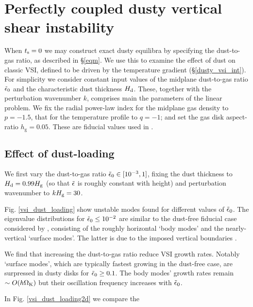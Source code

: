 \section{Perfectly coupled
  dusty vertical shear instability}\label{results} 

When $\tstop=0$ we may construct exact dusty equilibra by specifying
the dust-to-gas ratio, as described in \S\ref{eqm}. We use this to
examine the effect of dust on classic VSI, defined to be driven by the
temperature gradient (\S\ref{dusty_vsi_int}). For simplicity we
consider constant input values of the midplane dust-to-gas ratio
$\tepsilon_0$ and the characteristic dust thickness $\Hd$. These,
together with the perturbation wavenumber $k$, comprises main the
parameters of the linear problem. We fix the radial power-law index
for the midplane gas density to $p = -1.5$, that for the
temperature profile to $q=-1$; and set the gas disk aspect-ratio
$h_\mathrm{g}=0.05$. These are fiducial values used in . 

\subsection{Effect of dust-loading}
We first vary the dust-to-gas ratio $\tepsilon_0\in[10^{-3},1]$,
fixing the dust thickness to $\Hd=0.99\Hg$ (so that $\tepsilon$ is
roughly constant with height) and perturbation
wavenumber to $k\Hg = 30$. 

Fig. \ref{vsi_dust_loading} show unstable
modes found for different values of $\tepsilon_0$. The eigenvalue
distributions for $\tepsilon_0 \leq 10^{-2}$ are similar to the
dust-free fiducial case considered by , consisting
of the roughly horizontal `body modes' and the nearly-vertical
`surface modes'. The latter is due to the imposed vertical boundaries
\citep{barker15}.  

We find that increasing the dust-to-gas ratio reduce VSI growth
rates. Notably `surface modes', which are typically fastest growing in
the dust-free case, are surpressed in dusty disks for $\tepsilon_0\geq
0.1$. The body modes' growth rates remain $\sim O(h\OmK)$ but their
oscillation frequency increases with $\tepsilon_0$. 

In Fig. \ref{vsi_dust_loading2d} we compare the 


